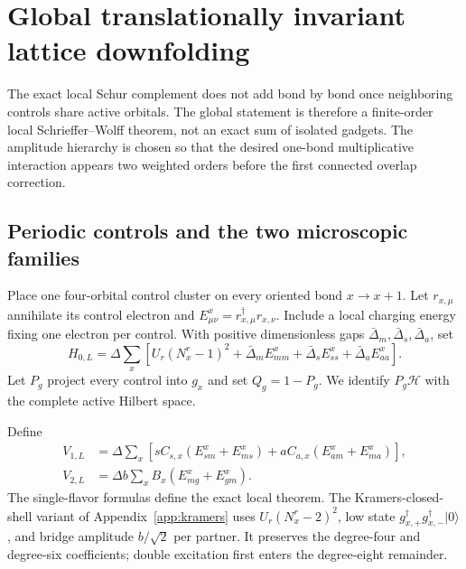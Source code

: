 \documentclass[11pt]{article}
\theoremstyle{definition}
\theoremstyle{remark}
\newcommand{\cH}{\mathcal H}
\newcommand{\ket}[1]{\lvert #1\rangle}
\begin{document}
\section{Global translationally invariant lattice downfolding}
\label{sec:global}

The exact local Schur complement does not add bond by bond once neighboring controls share active orbitals.  The global statement is therefore a finite-order local Schrieffer--Wolff theorem, not an exact sum of isolated gadgets.  The amplitude hierarchy is chosen so that the desired one-bond multiplicative interaction appears two weighted orders before the first connected overlap correction.

\subsection{Periodic controls and the two microscopic families}

Place one four-orbital control cluster on every oriented bond $x\to x+1$.  Let $r_{x,\mu}$ annihilate its control electron and $E^x_{\mu\nu}=r_{x,\mu}^\dagger r_{x,\nu}$.  Include a local charging energy fixing one electron per control.  With positive dimensionless gaps $\bar\Delta_m,\bar\Delta_s,\bar\Delta_a$, set
\begin{equation}
 H_{0,L}=\Delta\sum_x\left[U_r(N_x^r-1)^2+\bar\Delta_mE^x_{mm}+\bar\Delta_sE^x_{ss}+\bar\Delta_aE^x_{aa}\right].
 \label{eq:H0-global}
\end{equation}
Let $P_g$ project every control into $g_x$ and set $Q_g=1-P_g$.  We identify $P_g\cH$ with the complete active Hilbert space.

Define
\begin{align}
 V_{1,L}&=\Delta\sum_x[sC_{s,x}(E^x_{sm}+E^x_{ms})+aC_{a,x}(E^x_{am}+E^x_{ma})],
 \label{eq:V1}\\
 V_{2,L}&=\Delta b\sum_xB_x(E^x_{mg}+E^x_{gm}).
 \label{eq:V2}
\end{align}
The single-flavor formulas define the exact local theorem.  The Kramers-closed-shell variant of Appendix~\ref{app:kramers} uses $U_r(N_x^r-2)^2$, low state $g_{x,+}^\dagger g_{x,-}^\dagger\ket0$, and bridge amplitude $b/\sqrt2$ per partner.  It preserves the degree-four and degree-six coefficients; double excitation first enters the degree-eight remainder.
\end{document}
